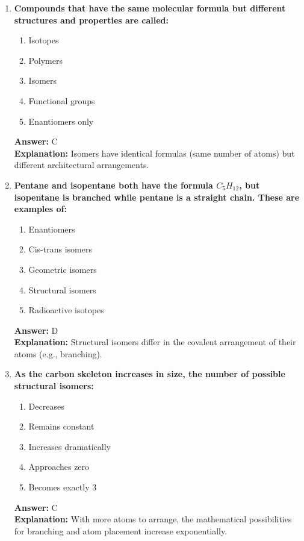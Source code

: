 \documentclass[11pt, a4paper]{article}
\begin{document}
\begin{enumerate}

\item \textbf{Compounds that have the same molecular formula but different structures and properties are called:}
\begin{enumerate}[label=\Alph*.]
    \item Isotopes
    \item Polymers
    \item Isomers
    \item Functional groups
    \item Enantiomers only
\end{enumerate}
\textbf{Answer:} C \\
\textbf{Explanation:} Isomers have identical formulas (same number of atoms) but different architectural arrangements.

\item \textbf{Pentane and isopentane both have the formula $C_5H_{12}$, but isopentane is branched while pentane is a straight chain. These are examples of:}
\begin{enumerate}[label=\Alph*.]
    \item Enantiomers
    \item Cis-trans isomers
    \item Geometric isomers
    \item Structural isomers
    \item Radioactive isotopes
\end{enumerate}
\textbf{Answer:} D \\
\textbf{Explanation:} Structural isomers differ in the covalent arrangement of their atoms (e.g., branching).

\item \textbf{As the carbon skeleton increases in size, the number of possible structural isomers:}
\begin{enumerate}[label=\Alph*.]
    \item Decreases
    \item Remains constant
    \item Increases dramatically
    \item Approaches zero
    \item Becomes exactly 3
\end{enumerate}
\textbf{Answer:} C \\
\textbf{Explanation:} With more atoms to arrange, the mathematical possibilities for branching and atom placement increase exponentially.


\end{enumerate}
\end{document}
